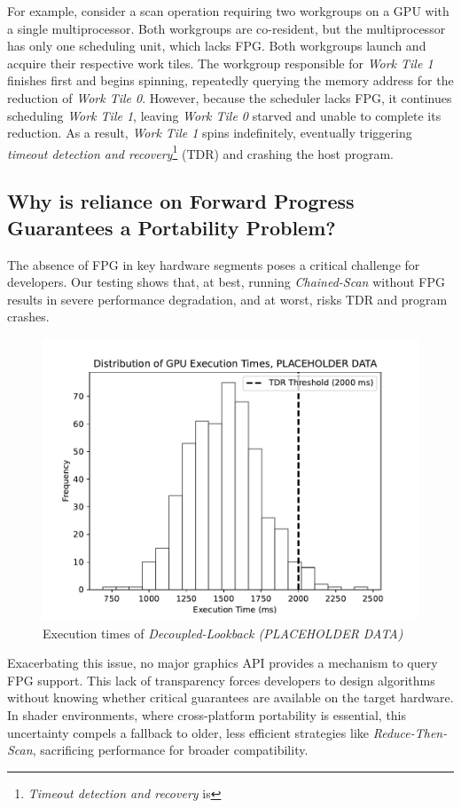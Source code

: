 \documentclass[sigconf]{acmart}
\begin{document}
For example, consider a scan operation requiring two workgroups on a GPU with a single multiprocessor. Both workgroups are co-resident, but the multiprocessor has only one scheduling unit, which lacks FPG\@. Both workgroups launch and acquire their respective work tiles. The workgroup responsible for \emph{Work Tile 1} finishes first and begins spinning, repeatedly querying the memory address for the reduction of \emph{Work Tile 0}. However, because the scheduler lacks FPG, it continues scheduling \emph{Work Tile 1}, leaving \emph{Work Tile 0} starved and unable to complete its reduction. As a result, \emph{Work Tile 1} spins indefinitely, eventually triggering \emph{timeout detection and recovery}\footnote{\emph{Timeout detection and recovery} is} (TDR) and crashing the host program.

\subsection{Why is reliance on Forward Progress Guarantees a Portability Problem?}
The absence of FPG in key hardware segments poses a critical challenge for developers. Our testing shows that, at best, running \emph{Chained-Scan} without FPG results in severe performance degradation, and at worst, risks TDR and program crashes.
\begin{figure}
  \centering
  \includegraphics[width=\linewidth]{graphics/Figure_1.pdf}
  \caption{Execution times of \emph{Decoupled-Lookback (PLACEHOLDER DATA)}}
\end{figure}
Exacerbating this issue, no major graphics API provides a mechanism to query FPG support. This lack of transparency forces developers to design algorithms without knowing whether critical guarantees are available on the target hardware. In shader environments, where cross-platform portability is essential, this uncertainty compels a fallback to older, less efficient strategies like \emph{Reduce-Then-Scan}, sacrificing performance for broader compatibility.
\end{document}
